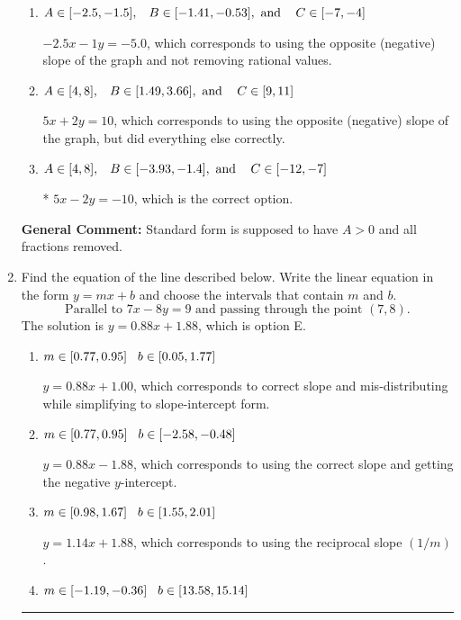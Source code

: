 \documentclass{extbook}[14pt]
\newcommand{\litem}[1]{\item #1

\rule{\textwidth}{0.4pt}}
\begin{document}
\begin{enumerate}
{\begin{enumerate}[label=\Alph*.]
 $-5x + 2y = 10$, which corresponds to not making $A$ positive (by multiplying the equation by $-1$).
\item \( A \in [-2.5, -1.5], \hspace{3mm} B \in [-1.41, -0.53], \text{ and } \hspace{3mm} C \in [-7, -4] \)

 $-2.5x - 1y = -5.0$, which corresponds to using the opposite (negative) slope of the graph and not removing rational values.
\item \( A \in [4, 8], \hspace{3mm} B \in [1.49, 3.66], \text{ and } \hspace{3mm} C \in [9, 11] \)

 $5x + 2y = 10$, which corresponds to using the opposite (negative) slope of the graph, but did everything else correctly.
\item \( A \in [4, 8], \hspace{3mm} B \in [-3.93, -1.4], \text{ and } \hspace{3mm} C \in [-12, -7] \)

* $5x - 2y = -10$, which is the correct option.
\end{enumerate}

\textbf{General Comment:} Standard form is supposed to have $A > 0$ and all fractions removed.
}
\litem{
Find the equation of the line described below. Write the linear equation in the form $ y=mx+b $ and choose the intervals that contain $m$ and $b$.
\[ \text{Parallel to } 7 x - 8 y = 9 \text{ and passing through the point } (7, 8). \]The solution is \( y = 0.88x + 1.88 \), which is option E.\begin{enumerate}[label=\Alph*.]
\item \( m \in [0.77, 0.95] \hspace*{3mm} b \in [0.05, 1.77] \)

 $y = 0.88x + 1.00$, which corresponds to correct slope and mis-distributing while simplifying to slope-intercept form.
\item \( m \in [0.77, 0.95] \hspace*{3mm} b \in [-2.58, -0.48] \)

 $y = 0.88x - 1.88$, which corresponds to using the correct slope and getting the negative $y$-intercept.
\item \( m \in [0.98, 1.67] \hspace*{3mm} b \in [1.55, 2.01] \)

 $y = 1.14x + 1.88$, which corresponds to using the reciprocal slope $(1/m)$.
\item \( m \in [-1.19, -0.36] \hspace*{3mm} b \in [13.58, 15.14] \)


\end{enumerate}}
\end{enumerate}
\end{document}
